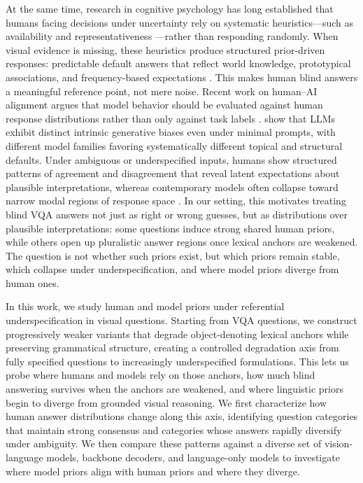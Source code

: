 \documentclass[letterpaper]{article}
\begin{document}
At the same time, research in cognitive psychology has long established that
humans facing decisions under uncertainty rely on systematic heuristics---such
as availability and representativeness \citep{tversky1974judgment}---rather
than responding randomly. When visual evidence is missing, these heuristics
produce structured prior-driven responses: predictable default answers that
reflect world knowledge, prototypical associations, and frequency-based
expectations \citep{kahneman2011thinking}. This makes human blind answers a
meaningful reference point, not mere noise. Recent work on human--AI alignment
argues that model behavior should be evaluated against human response
distributions rather than only against task labels
\citep{lan2025mind,bao2026imagination}. \citet{kwon2025whatllms} show that
LLMs exhibit distinct intrinsic generative biases even under minimal
prompts, with different model families favoring systematically different
topical and structural defaults. Under ambiguous or underspecified
inputs, humans show structured patterns of agreement and disagreement that
reveal latent expectations about plausible interpretations, whereas
contemporary models often collapse toward narrow modal regions of response
space \citep{bao2026imagination}. In our setting, this motivates treating
blind VQA answers not just as right or wrong guesses, but as distributions
over plausible interpretations: some questions induce strong shared human
priors, while others open up pluralistic answer regions once lexical anchors
are weakened. The question is not whether such priors exist, but which priors
remain stable, which collapse under underspecification, and where model priors
diverge from human ones.

In this work, we study human and model priors under referential
underspecification in visual questions. Starting from VQA questions, we
construct progressively weaker variants that degrade object-denoting lexical
anchors while preserving grammatical structure, creating a controlled
degradation axis from fully specified questions to increasingly
underspecified formulations. This lets us probe where humans and models rely
on those anchors, how much blind answering survives when the anchors are
weakened, and where linguistic priors begin to diverge from grounded visual
reasoning. We first characterize how human answer distributions change along
this axis, identifying question categories that maintain strong consensus and
categories whose answers rapidly diversify under ambiguity. We then compare
these patterns against a diverse set of vision-language models, backbone
decoders, and language-only models to investigate where model priors align
with human priors and where they diverge.
\end{document}
